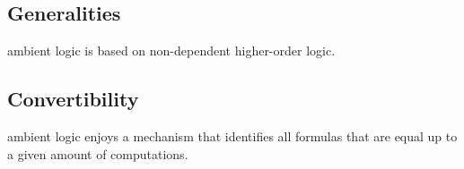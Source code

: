 

\newcommand{\ambientKeywords}{}

\newcommand{\tacname}{Error tacname}
\newcommand{\vtacname}{Error tacname}

\newcommand{\addTactic}[3]{
  \expandafter\def\expandafter\ambientKeywords\expandafter{\ambientKeywords,#1}
  \renewcommand{\tacname}{\rawec{#1}}
  \renewcommand{\vtacname}{#1}
  \index{ambient}{#1@\rawec{#1}}
  \subsubsection{#1}
  \Syntax \ec{#1} #2
  \Description
}


\newcommand{\example}[6]%
{
\vspace*{3ex}
\begin{tabular}{ccc}
\parbox{100pt}{#1} & {\expandafter\rawec\expandafter{#3 #4.}} & \parbox{100pt}{#5} \\
\cline{0-0} \cline{3-3} {\ec{#2}} & ~ & {\ec{#6}} \\
\end{tabular}\\
}

\newcommand{\env}[2]{\ec{#1 : #2}\\}

\newcommand{\vararg}[1]{\ec{#1}}
\newcommand{\cstarg}[1]{\ec{#1}}
\newcommand{\typarg}[1]{\textit{#1}}

\newcommand{\tacarg}[2]{(\vararg{#1}:\typarg{#2})}

\newcommand{\refdef}[1]{\emph{#1}(\ref{#1})}



\subsection{Generalities}

\EasyCrypt ambient logic is based on non-dependent higher-order logic.

\subsection{Convertibility}\label{convertible}

\EasyCrypt ambient logic enjoys a mechanism that identifies all formulas
that are equal up to a given amount of computations.

